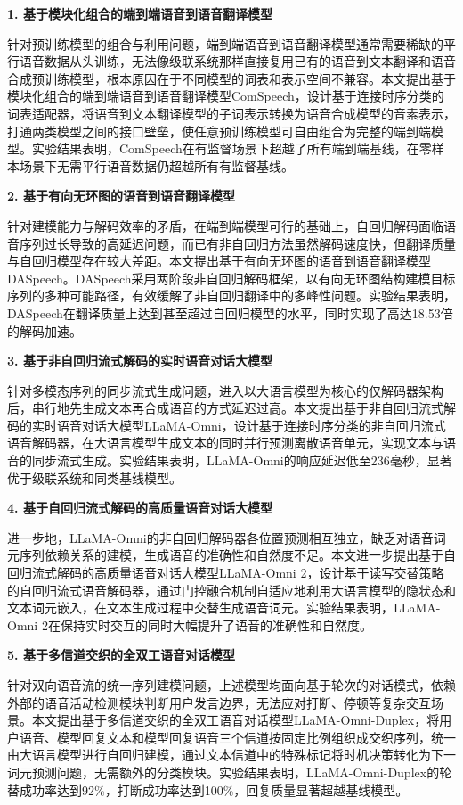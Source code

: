 \textbf{1. 基于模块化组合的端到端语音到语音翻译模型}

针对预训练模型的组合与利用问题，端到端语音到语音翻译模型通常需要稀缺的平行语音数据从头训练，无法像级联系统那样直接复用已有的语音到文本翻译和语音合成预训练模型，根本原因在于不同模型的词表和表示空间不兼容。本文提出基于模块化组合的端到端语音到语音翻译模型ComSpeech，设计基于连接时序分类的词表适配器，将语音到文本翻译模型的子词表示转换为语音合成模型的音素表示，打通两类模型之间的接口壁垒，使任意预训练模型可自由组合为完整的端到端模型。实验结果表明，ComSpeech在有监督场景下超越了所有端到端基线，在零样本场景下无需平行语音数据仍超越所有有监督基线。

\textbf{2. 基于有向无环图的语音到语音翻译模型}

针对建模能力与解码效率的矛盾，在端到端模型可行的基础上，自回归解码面临语音序列过长导致的高延迟问题，而已有非自回归方法虽然解码速度快，但翻译质量与自回归模型存在较大差距。本文提出基于有向无环图的语音到语音翻译模型DASpeech。DASpeech采用两阶段非自回归解码框架，以有向无环图结构建模目标序列的多种可能路径，有效缓解了非自回归翻译中的多峰性问题。实验结果表明，DASpeech在翻译质量上达到甚至超过自回归模型的水平，同时实现了高达18.53倍的解码加速。

\textbf{3. 基于非自回归流式解码的实时语音对话大模型}

针对多模态序列的同步流式生成问题，进入以大语言模型为核心的仅解码器架构后，串行地先生成文本再合成语音的方式延迟过高。本文提出基于非自回归流式解码的实时语音对话大模型LLaMA-Omni，设计基于连接时序分类的非自回归流式语音解码器，在大语言模型生成文本的同时并行预测离散语音单元，实现文本与语音的同步流式生成。实验结果表明，LLaMA-Omni的响应延迟低至236毫秒，显著优于级联系统和同类基线模型。

\textbf{4. 基于自回归流式解码的高质量语音对话大模型}

进一步地，LLaMA-Omni的非自回归解码器各位置预测相互独立，缺乏对语音词元序列依赖关系的建模，生成语音的准确性和自然度不足。本文进一步提出基于自回归流式解码的高质量语音对话大模型LLaMA-Omni 2，设计基于读写交替策略的自回归流式语音解码器，通过门控融合机制自适应地利用大语言模型的隐状态和文本词元嵌入，在文本生成过程中交替生成语音词元。实验结果表明，LLaMA-Omni 2在保持实时交互的同时大幅提升了语音的准确性和自然度。

\textbf{5. 基于多信道交织的全双工语音对话模型}

针对双向语音流的统一序列建模问题，上述模型均面向基于轮次的对话模式，依赖外部的语音活动检测模块判断用户发言边界，无法应对打断、停顿等复杂交互场景。本文提出基于多信道交织的全双工语音对话模型LLaMA-Omni-Duplex，将用户语音、模型回复文本和模型回复语音三个信道按固定比例组织成交织序列，统一由大语言模型进行自回归建模，通过文本信道中的特殊标记将时机决策转化为下一词元预测问题，无需额外的分类模块。实验结果表明，LLaMA-Omni-Duplex的轮替成功率达到92\%，打断成功率达到100\%，回复质量显著超越基线模型。

